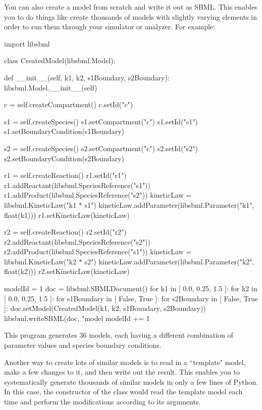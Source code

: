 \documentclass{sbmlmanual}
\begin{document}
You can also create a model from scratch and write it out as
SBML.  This enables you to do things like create thousands of
models with slightly varying elements in order to run them
through your simulator or analyzer.  For example:

\begin{boxedCodeVerbatim}
import libsbml

class CreatedModel(libsbml.Model):

   def __init__(self, k1, k2, s1Boundary, s2Boundary):
      libsbml.Model.__init__(self)

      c = self.createCompartment()
      c.setId("c")

      s1 = self.createSpecies()
      s1.setCompartment("c")
      s1.setId("s1")
      s1.setBoundaryCondition(s1Boundary)

      s2 = self.createSpecies()
      s2.setCompartment("c")
      s2.setId("s2")
      s2.setBoundaryCondition(s2Boundary)
      
      r1 = self.createReaction()
      r1.setId("r1")
      r1.addReactant(libsbml.SpeciesReference("s1"))
      r1.addProduct(libsbml.SpeciesReference("s2"))
      kineticLaw = libsbml.KineticLaw("k1 * s1")
      kineticLaw.addParameter(libsbml.Parameter("k1", float(k1)))
      r1.setKineticLaw(kineticLaw)

      r2 = self.createReaction()
      r2.setId("r2")
      r2.addReactant(libsbml.SpeciesReference("s2"))
      r2.addProduct(libsbml.SpeciesReference("s1"))
      kineticLaw = libsbml.KineticLaw("k2 * s2")
      kineticLaw.addParameter(libsbml.Parameter("k2", float(k2)))
      r2.setKineticLaw(kineticLaw)


modelId = 1
doc = libsbml.SBMLDocument()
for k1 in [ 0.0, 0.25, 1.5 ]:
   for k2 in [ 0.0, 0.25, 1.5 ]:
      for s1Boundary in [ False, True ]:
         for s2Boundary in [ False, True ]:
            doc.setModel(CreatedModel(k1, k2, s1Boundary, s2Boundary))
            libsbml.writeSBML(doc, "model%
            modelId += 1
\end{boxedCodeVerbatim}

This program generates 36 models, each having a different
combination of parameter values and species boundary
conditions.

Another way to create lots of similar models is to read in a
``template" model, make a few changes to it, and then write
out the result.  This enables you to systematically generate
thousands of similar models in only a few lines of Python.
In this case, the constructor of the  class would
read the template model each time and perform the
modifications according to its arguments.
\end{document}
